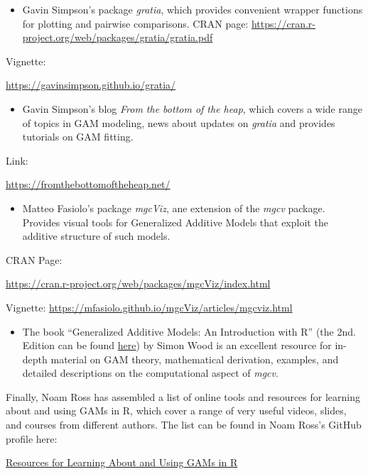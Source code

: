 \documentclass[
]{article}
\providecommand{\tightlist}{%
  \setlength{\itemsep}{0pt}\setlength{\parskip}{0pt}}
\begin{document}
\begin{itemize}
\tightlist
\item
  Gavin Simpson's package \emph{gratia}, which provides convenient wrapper functions for plotting and pairwise comparisons.
  CRAN page:
  \url{https://cran.r-project.org/web/packages/gratia/gratia.pdf}
\end{itemize}

Vignette:

\url{https://gavinsimpson.github.io/gratia/}

\begin{itemize}
\tightlist
\item
  Gavin Simpson's blog \emph{From the bottom of the heap}, which covers a wide range of topics in GAM modeling, news about updates on \emph{gratia} and provides tutorials on GAM fitting.
\end{itemize}

Link:

\url{https://fromthebottomoftheheap.net/}

\begin{itemize}
\tightlist
\item
  Matteo Fasiolo's package \emph{mgcViz}, ane extension of the \emph{mgcv} package. Provides visual tools for Generalized Additive Models that exploit the additive structure of such models.
\end{itemize}

CRAN Page:

\url{https://cran.r-project.org/web/packages/mgcViz/index.html}

Vignette:
\url{https://mfasiolo.github.io/mgcViz/articles/mgcviz.html}

\begin{itemize}
\tightlist
\item
  The book ``Generalized Additive Models: An Introduction with R'' (the 2nd. Edition can be found \href{https://www.routledge.com/Generalized-Additive-Models-An-Introduction-with-R-Second-Edition/Wood/p/book/9781498728331}{here}) by Simon Wood is an excellent resource for in-depth material on GAM theory, mathematical derivation, examples, and detailed descriptions on the computational aspect of \emph{mgcv}.
\end{itemize}

Finally, Noam Ross has assembled a list of online tools and resources for learning about and using GAMs in R, which cover a range of very useful videos, slides, and courses from different authors. The list can be found in Noam Ross's GitHub profile here:

\href{https://github.com/noamross/gam-resources}{Resources for Learning About and Using GAMs in R}
\end{document}
